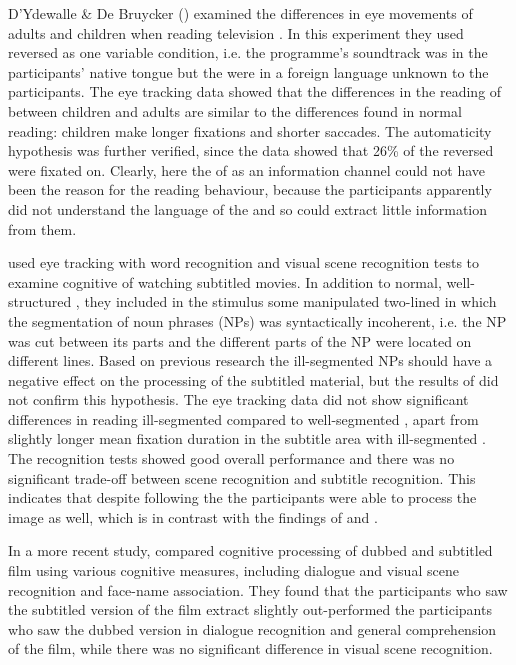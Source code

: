 \documentclass[output=paper]{langsci/langscibook}
\begin{document}
D'Ydewalle \& De Bruycker (\citeyear*{Bruycker2007}) examined the differences in eye movements of adults and children when reading television . In this experiment they used reversed  as one variable condition, i.e. the programme's soundtrack was in the participants' native tongue but the  were in a foreign language unknown to the participants. The eye tracking data showed that the differences in the reading of  between children and adults are similar to the differences found in normal reading: children make longer fixations and shorter saccades. The automaticity hypothesis was further verified, since the data showed that 26\% of the reversed  were fixated on. Clearly, here the  of  as an information channel could not have been the reason for the reading behaviour, because the participants apparently did not understand the language of the  and so could extract little information from them. 

\citet{Perego2010} used eye tracking with word recognition and visual scene recognition tests to examine cognitive  of watching subtitled movies. In addition to normal, well-structured , they included in the stimulus some manipulated two-lined  in which the segmentation of noun phrases (NPs) was syntactically incoherent, i.e. the NP was cut between its parts and the different parts of the NP were located on different lines. Based on previous research \citep{Perego2008} the ill-segmented NPs should have a negative effect on the processing of the subtitled material, but the results of \citet{Perego2010} did not confirm this hypothesis. The eye tracking data did not show significant differences in reading ill-segmented  compared to well-segmented , apart from slightly longer mean fixation duration in the subtitle area with ill-segmented . The recognition tests showed good overall performance and there was no significant trade-off between scene recognition and subtitle recognition. This indicates that despite following the  the participants were able to process the image as well, which is in contrast with the findings of \citet{lee2013} and \citet{lavaur2011}.

In a more recent study, \citet{Perego2015} compared cognitive processing of dubbed and subtitled film using various cognitive measures, including dialogue and visual scene recognition and face-name association. They found that the participants who saw the subtitled version of the film extract slightly out-performed the participants who saw the dubbed version in dialogue recognition and general comprehension of the film, while there was no significant difference in visual scene recognition. 
\end{document}

